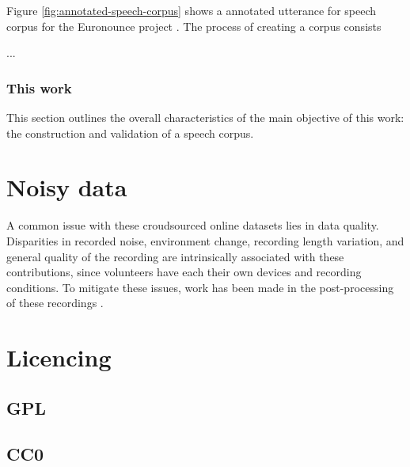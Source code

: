 Figure \ref{fig:annotated-speech-corpus} shows a annotated utterance for speech corpus for the Euronounce project \cite{demenko2009applying}. The process of creating a corpus consists 

...

\subsubsection{This work}

This section outlines the overall characteristics of the main objective of this work: the construction and validation of a speech corpus.

\section{Noisy data}

A common issue with these croudsourced online datasets lies in data quality. Disparities in recorded noise, environment change, recording length variation, and general quality of the recording are intrinsically associated with these contributions, since volunteers have each their own devices and recording conditions. To mitigate these issues, work has been made in the post-processing of these recordings \cite{krishna2019speech}.

\section{Licencing}

\subsection{GPL}

\subsection{CC0}

